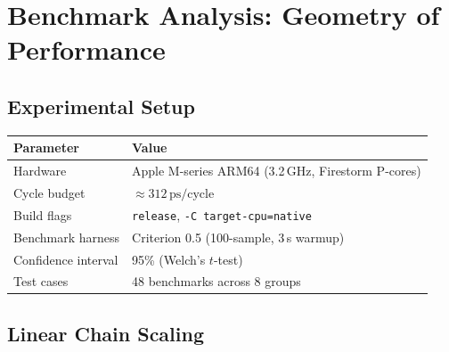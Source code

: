 \documentclass[12pt,a4paper]{article}
\theoremstyle{definition}
\theoremstyle{remark}
\begin{document}
\section{Benchmark Analysis: Geometry of Performance}
\label{sec:benchmarks}

\subsection{Experimental Setup}

\begin{center}
\renewcommand{\arraystretch}{1.1}
\begin{tabular}{ll}
\toprule
\textbf{Parameter} & \textbf{Value} \\
\midrule
Hardware & Apple M-series ARM64 (3.2\,GHz, Firestorm P-cores) \\
Cycle budget & $\approx 312\,\text{ps}/\text{cycle}$ \\
Build flags & \texttt{release}, \texttt{-C target-cpu=native} \\
Benchmark harness & Criterion 0.5 (100-sample, 3\,s warmup) \\
Confidence interval & 95\% (Welch's $t$-test) \\
Test cases & 48 benchmarks across 8 groups \\
\bottomrule
\end{tabular}
\end{center}

\subsection{Linear Chain Scaling}
\end{document}
